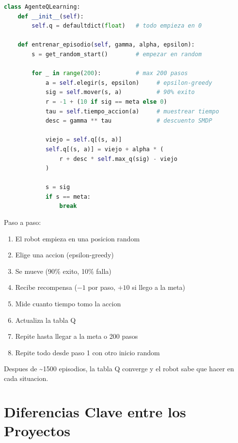 \documentclass[11pt,a4paper]{article}
\begin{document}
\begin{lstlisting}[language=Python]
class AgenteQLearning:
    def __init__(self):
        self.q = defaultdict(float)   # todo empieza en 0

    def entrenar_episodio(self, gamma, alpha, epsilon):
        s = get_random_start()        # empezar en random

        for _ in range(200):          # max 200 pasos
            a = self.elegir(s, epsilon)     # epsilon-greedy
            sig = self.mover(s, a)          # 90% exito
            r = -1 + (10 if sig == meta else 0)
            tau = self.tiempo_accion(a)     # muestrear tiempo
            desc = gamma ** tau             # descuento SMDP

            viejo = self.q[(s, a)]
            self.q[(s, a)] = viejo + alpha * (
                r + desc * self.max_q(sig) - viejo
            )

            s = sig
            if s == meta:
                break
\end{lstlisting}

Paso a paso:
\begin{enumerate}
    \item El robot empieza en una posicion random
    \item Elige una accion (epsilon-greedy)
    \item Se mueve (90\% exito, 10\% falla)
    \item Recibe recompensa ($-1$ por paso, $+10$ si llego a la meta)
    \item Mide cuanto tiempo tomo la accion
    \item Actualiza la tabla Q
    \item Repite hasta llegar a la meta o 200 pasos
    \item Repite todo desde paso 1 con otro inicio random
\end{enumerate}

Despues de \~{}1500 episodios, la tabla Q converge y el robot sabe que hacer en cada situacion.

\newpage

\section{Diferencias Clave entre los Proyectos}
\end{document}
